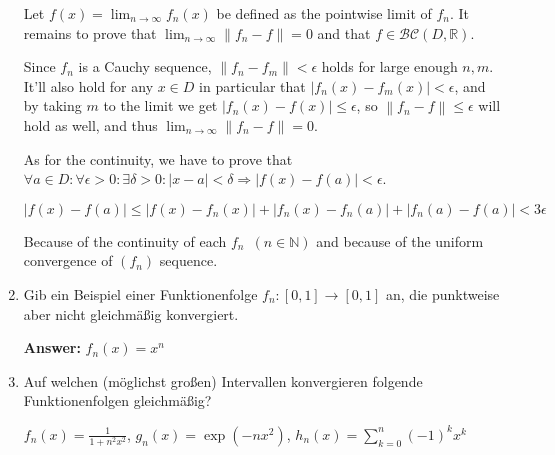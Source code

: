 \documentclass[11pt]{article}
\newcommand{\norm}[1]{\left\lVert#1\right\rVert}
\newcommand{\abs}[1]{\left|#1\right|}
\begin{document}
\begin{enumerate}
Let $f(x) = \lim_{n\to\infty}f_n(x)$ be defined as the pointwise limit of $f_n$. It remains to prove that $\lim_{n\to\infty} \norm{f_n - f} = 0$ and that $f \in \mathcal{BC}(D,\mathbb{R})$.

Since $f_n$ is a Cauchy sequence, $\norm{f_n - f_m} < \epsilon$ holds for large enough $n,m$. It'll also hold for any $x\in D$ in particular that $\abs{f_n(x) - f_m(x)} < \epsilon$, and by taking $m$ to the limit we get $\abs{f_n(x) - f(x)} \le \epsilon$, so $\norm{f_n - f} \le \epsilon$ will hold as well, and thus $\lim_{n\to\infty}\norm{f_n - f} = 0$.

As for the continuity, we have to prove that $\forall a \in D\colon\forall \epsilon > 0\colon\exists\delta > 0\colon \abs{x - a} < \delta \Rightarrow \abs{f(x) - f(a)} < \epsilon$. 


$$\abs{f(x) - f(a)} \le \abs{f(x) - f_n(x)} + \abs{f_n(x) - f_n(a)} + \abs{f_n(a) - f(a)} < 3\epsilon$$

Because of the continuity of each $f_n\phantom{0}(n \in \mathbb{N})$ and because of the uniform convergence of $(f_n)$ sequence.

\item Gib ein Beispiel einer Funktionenfolge $f_n\colon [0,1] \to [0,1]$ an, die punktweise aber nicht gleichmäßig konvergiert.

\textbf{Answer:} $f_n(x) = x^n$

\item Auf welchen (möglichst großen) Intervallen konvergieren folgende Funktionenfolgen gleichmäßig?

\begin{center}
    $f_n(x) = \frac{1}{1 + n^2 x^2}$, $g_n(x) = \exp(-nx^2)$, $h_n(x) = \sum_{k=0}^n{(-1)^k x^k}$
\end{center}


\end{enumerate}
\end{document}
